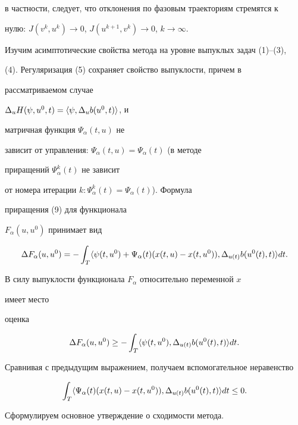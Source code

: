 в частности, следует, что отклонения по фазовым траекториям стремятся к 


нулю: $J(v^k,u^k)\to 0$, $J(u^{k+1},v^k)\to 0$, $k\to\infty$. 


 


Изучим асимптотические свойства метода на уровне выпуклых задач (1)--(3), 


(4). Регуляризация (5) сохраняет свойство выпуклости, причем в 


рассматриваемом случае 


$\Delta_u H(\psi,u^0,t)=\langle\psi,\Delta_u b(u^0,t)\rangle$, и 


матричная функция $\Psi_\alpha(t,u)$ не 


зависит от управления: $\Psi_\alpha(t,u)=\Psi_\alpha(t)$ (в методе 


приращений $\Psi^k_\alpha(t)$ не зависит 


от номера итерации $k:\Psi^k_\alpha(t)=\Psi_\alpha(t)$). Формула 


приращения (9) для функционала 


$F_\alpha(u,u^0)$ принимает вид 


$$ 


\Delta F_\alpha(u,u^0)=-\int_T\la\psi(t,u^0)+\Psi_\alpha(t) 


(x(t,u)-x(t,u^0)),\Delta_{u(t)}b(u^0(t),t)\ra dt. 


$$ 


В силу выпуклости функционала $F_\alpha$ относительно переменной $x$ 


имеет место 


оценка 


$$


\Delta F_\alpha(u,u^0)\ge-\int_T\la\psi(t,u^0), 


\Delta_{u(t)}b(u^0(t),t)\ra dt. 


$$ 


Сравнивая с предыдущим выражением, получаем вспомогательное неравенство 


\begin{equation} 


\int_T\la\Psi_\alpha(t)(x(t,u)-x(t,u^0)), 


\Delta_{u(t)}b(u^0(t),t)\ra dt\le 0. 


\end{equation} 


 


Сформулируем основное утверждение о сходимости метода. 


